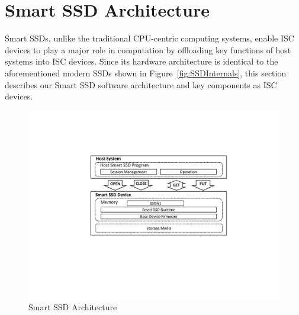 
\section{Smart SSD Architecture}\label{sec:ssdArch}



Smart SSDs, unlike the traditional CPU-centric computing systems, enable ISC devices to play a major role in computation by offloading key functions of host systems into ISC devices. Since its hardware architecture is identical to the aforementioned modern SSDs shown in Figure~\ref{fig:SSDInternals}, this section describes our Smart SSD software architecture and key components as ISC devices.



\begin{figure}[htbp]
	\centering
		\includegraphics[width=0.9\columnwidth]{figures/SmartSSD_Architecture.pdf}
	\caption{\small Smart SSD Architecture}
	\label{fig:SmartSSD_arch}
\end{figure}


